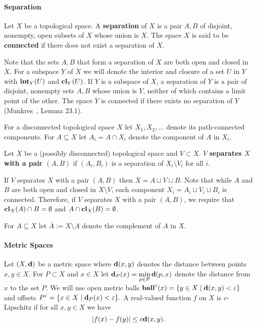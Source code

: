 
\paragraph{Separation}

Let $X$ be a topological space.
A \textbf{separation} of $X$ is a pair $A, B$ of disjoint, nonempty, open subsets of $X$ whose union is $X$.
The space $X$ is said to be \textbf{connected} if there does not exist a separation of $X$.

Note that the sets $A, B$ that form a separation of $X$ are both open and closed in $X$.
For a subspace $Y$ of $X$ we will denote the interior and closure of a set $U$ in $Y$ with $\mathbf{int}_Y(U)$ and $\mathbf{cl}_Y(U)$.
If $Y$ is a subspace of $X$, a separation of $Y$ is a pair of disjoint, nonempty sets $A, B$ whose union is $Y$, neither of which contains a limit point of the other.
The space $Y$ is connected if there exists no separation of $Y$ (Munkres~\cite{munkres00topology}, Lemma 23.1).

For a disconnected topological space $X$ let $X_1, X_2, \ldots$ denote its path-connected components.
For $A\subseteq X$ let $A_i = A\cap X_i$ denote the component of $A$ in $X_i$.

\begin{definition}
  Let $X$ be a (possibly disconnected) topological space and $V\subset X$.
  $V$ \textbf{separates $X$ with a pair $(A, B)$} if $(A_i, B_i)$ is a separation of $X_i\setminus V_i$ for all $i$.
\end{definition}

If $V$ separates $X$ with a pair $(A, B)$ then $X = A\sqcup V\sqcup B$.
Note that while $A$ and $B$ are both open and closed in $X\setminus V$, each component $X_i = A_i\sqcup V_i\sqcup B_i$ is connected.
Therefore, if $V$ separates $X$ with a pair $(A, B)$, we require that $\mathbf{cl}_X(A)\cap B = \emptyset$ and $A\cap \mathbf{cl}_X(B) = \emptyset$.

For $A\subseteq X$ let $\overline{A} := X\setminus A$ denote the complement of $A$ in $X$.

\paragraph{Metric Spaces}

Let $(X,\mathbf{d})$ be a metric space where $\mathbf{d}(x, y)$ denotes the distance between points $x,y\in X$.
For $P\subset X$ and $x\in X$ let $\mathbf{d}_P(x) = \displaystyle\min_{p\in P}\mathbf{d}(p, x)$ denote the distance from $x$ to the set $P$.
We will use open metric balls $\mathbf{ball}^\varepsilon(x) = \{y\in X\mid \mathbf{d}(x, y) < \varepsilon\}$ and offsets $P^\varepsilon = \{x\in X\mid \mathbf{d}_P(x) < \varepsilon\}.$
A real-valued function $f$ on $X$ is $c$-Lipschitz if for all $x,y\in X$ we have
\[
  |f(x) - f(y)| \le c \mathbf{d}(x,y).
\]

